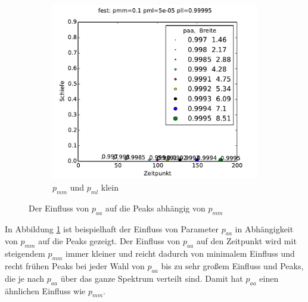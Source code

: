 \begin{figure}
\begin{subfigure}[t]{0.49\textwidth}
\includegraphics[width=\textwidth]{bilder/paa/3fest_01_5e-05_p_099995}
\caption{$p_{mm}$ und $p_{ml}$ klein}
\end{subfigure}
\caption{Der Einfluss von $p_{aa}$ auf die Peaks abhängig von $p_{mm}$}
\label{einfluss_paa}
\end{figure}

In Abbildung \ref{einfluss_paa} ist beispielhaft der Einfluss von Parameter $p_{aa}$ in Abhängigkeit von $p_{mm}$ auf die Peaks gezeigt. Der Einfluss von $p_{aa}$ auf den Zeitpunkt wird mit steigendem $p_{mm}$ immer kleiner und reicht dadurch von minimalem Einfluss und recht frühen Peaks bei jeder Wahl von $p_{aa}$ bis zu sehr großem Einfluss und Peaks, die je nach $p_{aa}$ über das ganze Spektrum verteilt sind. Damit hat $p_{aa}$ einen ähnlichen Einfluss wie $p_{mm}$.

